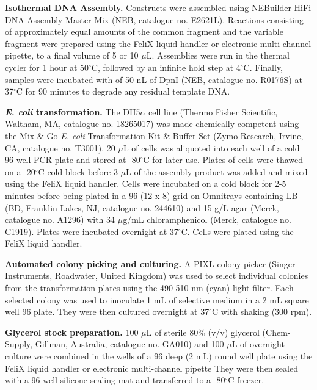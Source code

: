 \textbf{Isothermal DNA Assembly.}
Constructs were assembled using NEBuilder HiFi DNA Assembly Master Mix (NEB, catalogue no. E2621L).
Reactions consisting of approximately equal amounts of the common fragment and the variable fragment were prepared using the FeliX liquid handler or electronic multi-channel pipette, to a final volume of 5 or 10 $\mu$L.
Assemblies were run in the thermal cycler for 1 hour at 50$^{\circ}$C, followed by an infinite hold step at 4$^{\circ}$C.
Finally, samples were incubated with of 50 nL of DpnI (NEB, catalogue no. R0176S) at 37$^{\circ}$C for 90 minutes to degrade any residual template DNA.

\textbf{\textit{E. coli} transformation.}
The DH5$\alpha$ cell line (Thermo Fisher Scientific, Waltham, MA, catalogue no. 18265017) was made chemically competent using the Mix $\&$ Go \textit{E. coli} Transformation Kit $\&$ Buffer Set (Zymo Research, Irvine, CA, catalogue no. T3001).
20 $\mu$L of cells was aliquoted into each well of a cold 96-well PCR plate and stored at -80$^{\circ}$C for later use.
Plates of cells were thawed on a -20$^{\circ}$C cold block before 3 $\mu$L of the assembly product was added and mixed using the FeliX liquid handler.
Cells were incubated on a cold block for 2-5 minutes before being plated in a 96 (12 x 8) grid on Omnitrays containing LB (BD, Franklin Lakes, NJ, catalogue no. 244610) and 15 g/L agar (Merck, catalogue no. A1296) with 34 $\mu$g/mL chloramphenicol (Merck, catalogue no. C1919).
Plates were incubated overnight at 37$^{\circ}$C. Cells were plated using the FeliX liquid handler.

\textbf{Automated colony picking and culturing.}
A PIXL colony picker (Singer Instruments, Roadwater, United Kingdom) was used to select individual colonies from the transformation plates using the 490-510 nm (cyan) light filter.
Each selected colony was used to inoculate 1 mL of selective medium in a 2 mL square well 96 plate.
They were then cultured overnight at 37$^{\circ}$C with shaking (300 rpm).

\textbf{Glycerol stock preparation.}
100 $\mu$L of sterile 80\% (v/v) glycerol (Chem-Supply, Gillman, Australia, catalogue no. GA010) and 100 $\mu$L of overnight culture were combined in the wells of a 96 deep (2 mL) round well plate using the FeliX liquid handler or electronic multi-channel pipette
They were then sealed with a 96-well silicone sealing mat and transferred to a -80$^{\circ}$C freezer. 

